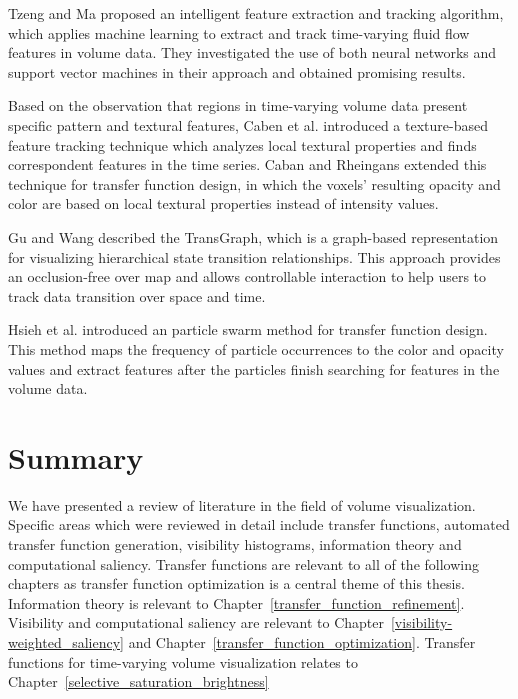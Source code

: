 Tzeng and Ma \cite{tzeng_intelligent_2005} proposed an intelligent feature extraction and tracking algorithm, which applies machine learning to extract and track time-varying fluid flow features in volume data.
They investigated the use of both neural networks and support vector machines in their approach and obtained promising results.

Based on the observation that regions in time-varying volume data present specific pattern and textural features, Caben et al. \cite{caban_texture-based_2007} introduced a texture-based feature tracking technique which analyzes local textural properties and finds correspondent features in the time series.
Caban and Rheingans \cite{caban_texture-based_2008} extended this technique for transfer function design, in which the voxels' resulting opacity and color are based on local textural properties instead of intensity values.

Gu and Wang \cite{gu_transgraph_2011} described the TransGraph, which is a graph-based representation for visualizing hierarchical state transition relationships. This approach provides an occlusion-free over map and allows controllable interaction to help users to track data transition over space and time.

Hsieh et al. \cite{hsieh_feature_2013} introduced an particle swarm method for transfer function design. This method maps the frequency of particle occurrences to the color and opacity values and extract features after the particles finish searching for features in the volume data.

\section{Summary}
We have presented a review of literature in the field of volume visualization.
Specific areas which were reviewed in detail include transfer functions, automated transfer function generation, visibility histograms, information theory and computational saliency.
Transfer functions are relevant to all of the following chapters as transfer function optimization is a central theme of this thesis.
Information theory is relevant to Chapter~\ref{transfer_function_refinement}.
Visibility and computational saliency are relevant to Chapter~\ref{visibility-weighted_saliency} and Chapter~\ref{transfer_function_optimization}.
Transfer functions for time-varying volume visualization relates to Chapter~\ref{selective_saturation_brightness}

